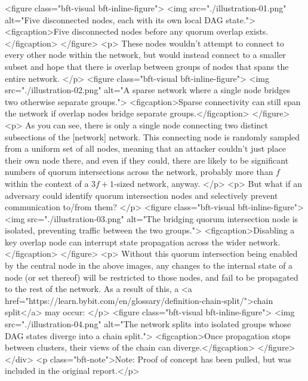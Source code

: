 \begin{rawhtml}
	            <figure class="bft-visual bft-inline-figure">
	            	<img src="./illustration-01.png" alt="Five disconnected nodes, each with its own local DAG state.">
	            	<figcaption>Five disconnected nodes before any quorum overlap exists.</figcaption>
	            </figure>
	            <p>
	            	These nodes wouldn't attempt to connect to every other node within the network, but would instead connect to a smaller subset and hope that there is overlap between groups of nodes that spans the entire network.
	            </p>
	            <figure class="bft-visual bft-inline-figure">
	            	<img src="./illustration-02.png" alt="A sparse network where a single node bridges two otherwise separate groups.">
	            	<figcaption>Sparse connectivity can still span the network if overlap nodes bridge separate groups.</figcaption>
	            </figure>
				<p>
					As you can see, there is only a single node connecting two distinct subsections of the [network] network. This connecting node is randomly sampled from a uniform set of all nodes, meaning that an attacker couldn't just place their own node there, and even if they could, there are likely to be significant numbers of quorum intersections across the network, probably more than $f$ within the context of a $3f + 1$-sized network, anyway.
				</p>
				<p>
					But what if an adversary could identify quorum intersection nodes and selectively prevent communication to/from them?
				</p>
    			<figure class="bft-visual bft-inline-figure">
    				<img src="./illustration-03.png" alt="The bridging quorum intersection node is isolated, preventing traffic between the two groups.">
    				<figcaption>Disabling a key overlap node can interrupt state propagation across the wider network.</figcaption>
    			</figure>
       			<p>
          				Without this quorum intersection being enabled by the central node in the above images, any changes to the internal state of a node (or set thereof) will be restricted to those nodes, and fail to be propagated to the rest of the network. As a result of this, a <a href="https://learn.bybit.com/en/glossary/definition-chain-split/">chain split</a> may occur:
          			</p>
     			<figure class="bft-visual bft-inline-figure">
     				<img src="./illustration-04.png" alt="The network splits into isolated groups whose DAG states diverge into a chain split.">
     				<figcaption>Once propagation stops between clusters, their views of the chain can diverge.</figcaption>
     			</figure>
            </div>
            <p class="bft-note">Note: Proof of concept has been pulled, but was included in the original report.</p>

\end{rawhtml}
